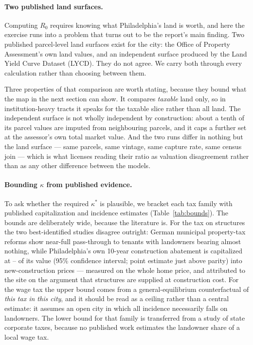 \documentclass[11pt]{article}
\begin{document}
\paragraph{Two published land surfaces.} Computing $R_0$ requires knowing what Philadelphia's
land is worth, and here the exercise runs into a problem that turns out to be the report's main
finding. Two published parcel-level land surfaces exist for the city: the Office of Property
Assessment's own land values, and an independent surface produced by the Land Yield Curve
Dataset (LYCD). They do not agree. We carry both through every calculation rather than
choosing between them.

Three properties of that comparison are worth stating, because they bound what the map in the
next section can show. It compares \emph{taxable} land only, so in institution-heavy tracts it
speaks for the taxable slice rather than all land. The independent surface is not wholly
independent by construction: about a tenth of its parcel values are imputed from neighbouring
parcels, and it caps a further set at the assessor's own total market value. And the two runs
differ in nothing but the land surface --- same parcels, same vintage, same capture rate, same
census join --- which is what licenses reading their ratio as valuation disagreement rather
than as any other difference between the models.

\paragraph{Bounding $\kappa$ from published evidence.} To ask whether the required $\kappa^*$
is plausible, we bracket each tax family with published capitalization and incidence
estimates (Table~\ref{tab:bounds}). The bounds are deliberately wide, because the literature
is. For the tax on structures the two best-identified studies disagree outright: German
municipal property-tax reforms show near-full pass-through to tenants with landowners bearing
almost nothing, while Philadelphia's own 10-year construction abatement %
is capitalized at \StxCosteCiLow{}--\StxCosteCiHigh{} of its value (95\% confidence interval; %
point estimate just above parity) into new-construction prices --- measured on the whole home
price, and attributed to the site on the argument that structures are supplied at
construction cost. For the wage tax the upper bound
comes from a general-equilibrium counterfactual of \emph{this tax in this city}, and it should
be read as a ceiling rather than a central estimate: it assumes an open city in which all
incidence necessarily falls on landowners. The lower bound for that family is transferred from
a study of state corporate taxes, because no published work estimates the landowner share of a
local wage tax.
\end{document}
